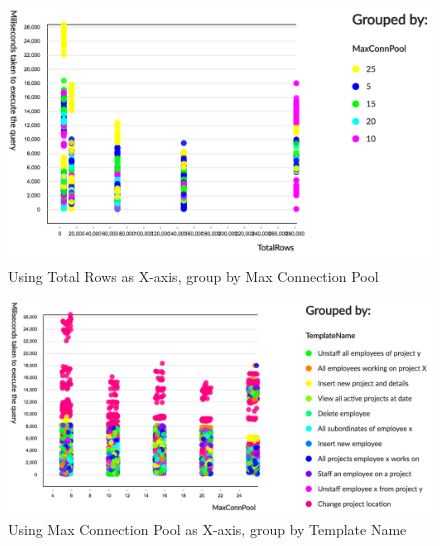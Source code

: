 \documentclass[12pt]{report}
\begin{document}
\begin{spacing}{1.9}
\begin{figure}[H]
	\end{figure}
	\begin{figure}[H]
		\centering
		\includegraphics[width=\textwidth]{maria2-conn.png}
		\caption{Using Total Rows as X-axis, group by Max Connection Pool}
		
	\end{figure}
	\begin{figure}[H]
		\centering
		\includegraphics[width=\textwidth]{maria2-mcp.png}
		\caption{Using Max Connection Pool as X-axis, group by Template Name}
		
	\end{figure}
	
	
\end{spacing}
\end{document}
